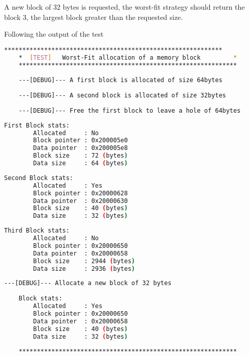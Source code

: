     A new block of 32 bytes is requested, the worst-fit strategy should return the block 3, the largest block greater than the requested size.

    Following the output of the test

    \begin{outputbox}
    \begin{lstlisting}[language=bash]
    ************************************************************
    *  [TEST]   Worst-Fit allocation of a memory block         *
    ************************************************************
    
    ---[DEBUG]--- A first block is allocated of size 64bytes
    
    ---[DEBUG]--- A second block is allocated of size 32bytes
    
    ---[DEBUG]--- Free the first block to leave a hole of 64bytes
    \end{lstlisting}
    \end{outputbox}
    
    \begin{outputbox}
    \begin{lstlisting}[language=bash]
    First Block stats:
        Allocated     : No
        Block pointer : 0x200005e0
        Data pointer  : 0x200005e8
        Block size    : 72 (bytes)
        Data size     : 64 (bytes)
    \end{lstlisting}
    \end{outputbox}
    
    \begin{outputbox}
    \begin{lstlisting}[language=bash]
    Second Block stats:
        Allocated     : Yes
        Block pointer : 0x20000628
        Data pointer  : 0x20000630
        Block size    : 40 (bytes)
        Data size     : 32 (bytes)
    \end{lstlisting}
    \end{outputbox}
    
    \begin{outputbox}
    \begin{lstlisting}[language=bash]
    Third Block stats:
        Allocated     : No
        Block pointer : 0x20000650
        Data pointer  : 0x20000658
        Block size    : 2944 (bytes)
        Data size     : 2936 (bytes)
    \end{lstlisting}
    \end{outputbox}
    
    \begin{outputbox}
    \begin{lstlisting}[language=bash]
    ---[DEBUG]--- Allocate a new block of 32 bytes
    
    Block stats:
        Allocated     : Yes
        Block pointer : 0x20000650
        Data pointer  : 0x20000658
        Block size    : 40 (bytes)
        Data size     : 32 (bytes)
    
    ************************************************************
    \end{lstlisting}
    \end{outputbox}